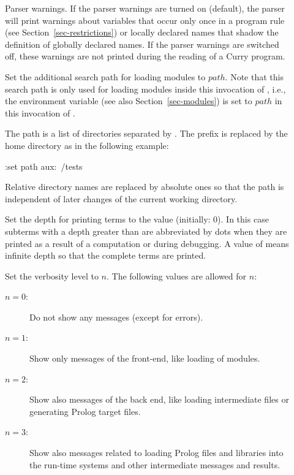 \begin{description}
\item[] Parser warnings. If the parser
warnings are turned on (default), the parser will print
warnings about variables that occur only once in a program rule
(see Section~\ref{sec-restrictions})
or locally declared names that shadow the definition of
globally declared names. If the parser warnings are switched off,
these warnings are not printed during the reading of a Curry program.

\item[] Set the additional search path
for loading modules to $path$.
Note that this search path is only used for loading modules
inside this invocation of \CYS, i.e., the environment variable
 (see also Section~\ref{sec-modules})
is set to $path$ in this invocation of \CYS.

The path is a list of directories separated by \ccode{:}.
The prefix  is replaced by the home directory as
in the following example:
\begin{curry}
:set path aux:~/tests
\end{curry}
Relative directory names are replaced by absolute ones
so that the path is independent of later changes of the
current working directory.

\item[]
Set the depth for printing terms to the value  (initially: 0).
In this case subterms with a depth greater than  are abbreviated
by dots when they are printed as a result of a computation
or during debugging. A value of  means infinite depth
so that the complete terms are printed.

\item[]
Set the verbosity level to $n$. The following values are allowed
for $n$:
\begin{description}
\item[$n=0$:] Do not show any messages (except for errors).
\item[$n=1$:] Show only messages of the front-end, like loading
of modules.
\item[$n=2$:]
Show also messages of the back end, like loading intermediate files
or generating Prolog target files.
\item[$n=3$:]
Show also messages related to loading Prolog files and libraries
into the run-time systems and other intermediate messages and results.
\end{description}


\end{description}
